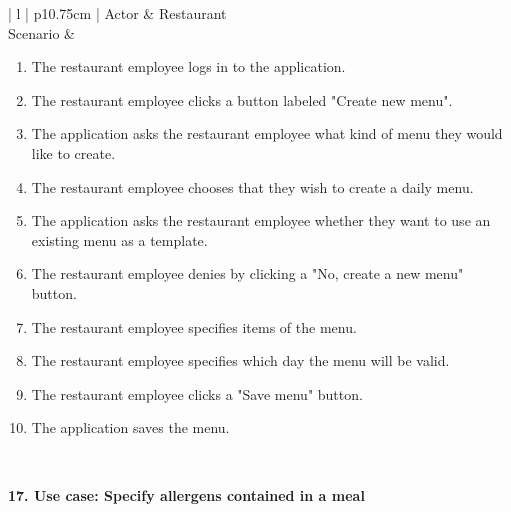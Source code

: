\begin{center}
  \begin{tabular}{| l | p{10.75cm} | }
    \hline
    Actor        & Restaurant \\
    \hline
    Scenario     &
    \begin{minipage}[t]{\linewidth}
      \begin{enumerate}[leftmargin=*,nosep,before=\vspace{-0.575\baselineskip},after=\strut]
        \item The restaurant employee logs in to the application.
        \item The restaurant employee clicks a button labeled "Create new menu".
        \item The application asks the restaurant employee what kind of menu they would like to create.
        \item The restaurant employee chooses that they wish to create a daily menu.
        \item The application asks the restaurant employee whether they want to use an existing menu as a template.
        \item The restaurant employee denies by clicking a "No, create a new menu" button.
        \item The restaurant employee specifies items of the menu.
        \item The restaurant employee specifies which day the menu will be valid.
        \item The restaurant employee clicks a "Save menu" button.
        \item The application saves the menu.
      \end{enumerate}
    \end{minipage}
    \\
    \hline
  \end{tabular}
  \newline
\end{center}

\noindent \textbf{17. Use case: Specify allergens contained in a meal}

